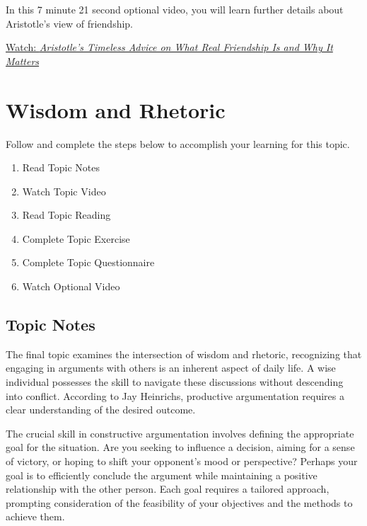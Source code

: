 \documentclass[
]{book}
\providecommand{\tightlist}{%
  \setlength{\itemsep}{0pt}\setlength{\parskip}{0pt}}
\begin{document}
\begin{reflect}
In this 7 minute 21 second optional video, you will learn further details about Aristotle's view of friendship.

\href{https://www.youtube.com/watch?v=F18kSA8OxqY}{Watch: \emph{Aristotle's Timeless Advice on What Real Friendship Is and Why It Matters}}
\end{reflect}

\hypertarget{wisdom-and-rhetoric}{%
\section{Wisdom and Rhetoric}\label{wisdom-and-rhetoric}}

Follow and complete the steps below to accomplish your learning for this topic.

\begin{enumerate}
\def\labelenumi{\arabic{enumi}.}
\tightlist
\item
  Read Topic Notes
\item
  Watch Topic Video
\item
  Read Topic Reading
\item
  Complete Topic Exercise
\item
  Complete Topic Questionnaire
\item
  Watch Optional Video
\end{enumerate}

\hypertarget{topic-notes-3}{%
\subsection*{Topic Notes}\label{topic-notes-3}}

The final topic examines the intersection of wisdom and rhetoric, recognizing that engaging in arguments with others is an inherent aspect of daily life. A wise individual possesses the skill to navigate these discussions without descending into conflict. According to Jay Heinrichs, productive argumentation requires a clear understanding of the desired outcome.

The crucial skill in constructive argumentation involves defining the appropriate goal for the situation. Are you seeking to influence a decision, aiming for a sense of victory, or hoping to shift your opponent's mood or perspective? Perhaps your goal is to efficiently conclude the argument while maintaining a positive relationship with the other person. Each goal requires a tailored approach, prompting consideration of the feasibility of your objectives and the methods to achieve them.
\end{document}
